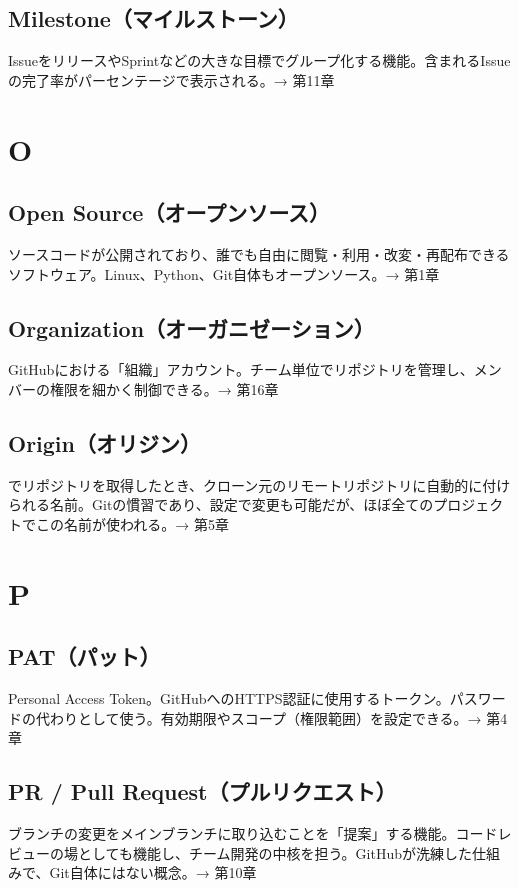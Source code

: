 \subsection*{Milestone（マイルストーン）}
IssueをリリースやSprintなどの大きな目標でグループ化する機能。含まれるIssueの完了率がパーセンテージで表示される。→ 第11章

\section*{O}

\subsection*{Open Source（オープンソース）}
ソースコードが公開されており、誰でも自由に閲覧・利用・改変・再配布できるソフトウェア。Linux、Python、Git自体もオープンソース。→ 第1章

\subsection*{Organization（オーガニゼーション）}
GitHubにおける「組織」アカウント。チーム単位でリポジトリを管理し、メンバーの権限を細かく制御できる。→ 第16章

\subsection*{Origin（オリジン）}
 でリポジトリを取得したとき、クローン元のリモートリポジトリに自動的に付けられる名前。Gitの慣習であり、設定で変更も可能だが、ほぼ全てのプロジェクトでこの名前が使われる。→ 第5章

\section*{P}

\subsection*{PAT（パット）}
Personal Access Token。GitHubへのHTTPS認証に使用するトークン。パスワードの代わりとして使う。有効期限やスコープ（権限範囲）を設定できる。→ 第4章

\subsection*{PR / Pull Request（プルリクエスト）}
ブランチの変更をメインブランチに取り込むことを「提案」する機能。コードレビューの場としても機能し、チーム開発の中核を担う。GitHubが洗練した仕組みで、Git自体にはない概念。→ 第10章

